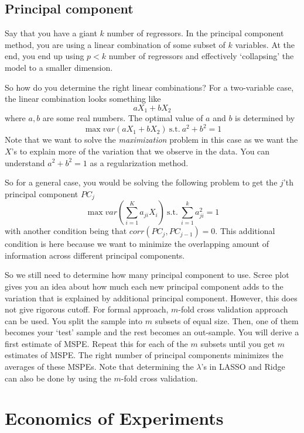 \documentclass[12pt]{article}
\theoremstyle{definition}
\theoremstyle{property}
\theoremstyle{assumption}
\theoremstyle{example}
\theoremstyle{comment}
\begin{document}
\subsection{Principal component}
Say that you have a giant $k$ number of regressors. In the principal component method, you are using a linear combination of some subset of $k$ variables. At the end, you end up using $p<k$ number of regressors and effectively `collapsing' the model to a smaller dimension. 
\par\medskip
So how do you determine the right linear combinations? For a two-variable case, the linear combination looks something like
\[
aX_1 + bX_2
\]
where $a,b$ are some real numbers. The optimal value of $a$ and $b$ is determined by
\[
\max var(aX_1+bX_2)\  \text{s.t.}\ a^2+b^2=1
\]
Note that we want to solve the \textit{maximization} problem in this case as we want the $X$'s to explain more of the variation that we observe in the data. You can understand $a^2+b^2=1$ as a regularization method. 
\par\medskip
So for a general case, you would be solving the following problem to get the $j$'th principal component $PC_j$
\[
\max var\left(\sum_{i=1}^Ka_{ji}X_i\right)\  \text{s.t.}\ \sum_{i=1}^ka_{ji}^2=1
\]
with another condition being that $corr(PC_j,PC_{j-1})=0$. This additional condition is here because we want to minimize the overlapping amount of information across different principal components.
\par\medskip
So we still need to determine how many principal component to use. Scree plot gives you an idea about how much each new principal component adds to the variation that is explained by additional principal component. However, this does not give rigorous cutoff. For formal approach, $m$-fold cross validation approach can be used. You split the sample into $m$ subsets of equal size. Then, one of them becomes your `test' sample and the rest becomes an out-sample. You will derive a first estimate of MSPE. Repeat this for each of the $m$ subsets until you get $m$ estimates of MSPE. The right number of  principal components minimizes the averages of these MSPEs. Note that determining the $\lambda$'s in LASSO and Ridge can also be done by using the $m$-fold cross validation. 

\section{Economics of Experiments}
\end{document}
